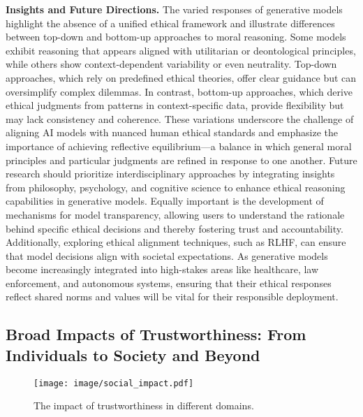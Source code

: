 \textbf{Insights and Future Directions.} The varied responses of generative models highlight the absence of a unified ethical framework and illustrate differences between top-down and bottom-up approaches to moral reasoning. Some models exhibit reasoning that appears aligned with utilitarian or deontological principles, while others show context-dependent variability or even neutrality. Top-down approaches, which rely on predefined ethical theories, offer clear guidance but can oversimplify complex dilemmas. In contrast, bottom-up approaches, which derive ethical judgments from patterns in context-specific data, provide flexibility but may lack consistency and coherence. These variations underscore the challenge of aligning AI models with nuanced human ethical standards and emphasize the importance of achieving reflective equilibrium—a balance in which general moral principles and particular judgments are refined in response to one another. Future research should prioritize interdisciplinary approaches by integrating insights from philosophy, psychology, and cognitive science to enhance ethical reasoning capabilities in generative models. Equally important is the development of mechanisms for model transparency, allowing users to understand the rationale behind specific ethical decisions and thereby fostering trust and accountability. Additionally, exploring ethical alignment techniques, such as RLHF, can ensure that model decisions align with societal expectations. As generative models become increasingly integrated into high-stakes areas like healthcare, law enforcement, and autonomous systems, ensuring that their ethical responses reflect shared norms and values will be vital for their responsible deployment.


\subsection{Broad Impacts of Trustworthiness: From Individuals to Society and Beyond}

\begin{figure}[h]
    \centering
    \texttt{[image: image/social\_impact.pdf]}
    \caption{The impact of trustworthiness in different domains.}\vspace{+0.15in}
    \label{fig:impact}
\end{figure}

